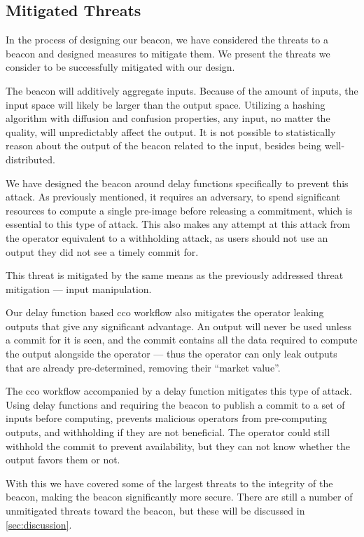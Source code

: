 \subsection{Mitigated Threats}
In the process of designing our beacon, we have considered the threats to a beacon and designed measures to mitigate them.
We present the threats we consider to be successfully mitigated with our design.

The beacon will additively aggregate inputs.
Because of the amount of inputs, the input space will likely be larger than the output space.
Utilizing a hashing algorithm with diffusion and confusion properties, any input, no matter the quality, will unpredictably affect the output.
It is not possible to statistically reason about the output of the beacon related to the input, besides being well-distributed.

We have designed the beacon around delay functions specifically to prevent this attack.
As previously mentioned, it requires an adversary, to spend significant resources to compute a single pre-image before releasing a commitment, which is essential to this type of attack.
This also makes any attempt at this attack from the operator equivalent to a withholding attack, as users should not use an output they did not see a timely commit for.

This threat is mitigated by the same means as the previously addressed threat mitigation --- input manipulation.

Our delay function based \gls{cco} workflow also mitigates the operator leaking outputs that give any significant advantage.
An output will never be used unless a commit for it is seen, and the commit contains all the data required to compute the output alongside the operator --- thus the operator can only leak outputs that are already pre-determined, removing their \enquote{market value}.

The \gls{cco} workflow accompanied by a delay function mitigates this type of attack.
Using delay functions and requiring the beacon to publish a commit to a set of inputs before computing, prevents malicious operators from pre-computing outputs, and withholding if they are not beneficial.
The operator could still withhold the commit to prevent availability, but they can not know whether the output favors them or not.

\bigskip
With this we have covered some of the largest threats to the integrity of the beacon, making the beacon significantly more secure.
There are still a number of unmitigated threats toward the beacon, but these will be discussed in \vref{sec:discussion}.

